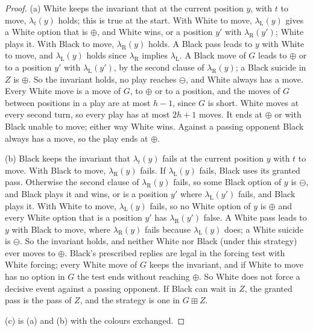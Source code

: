 \begin{proof}
(a) White keeps the invariant that at the current position $y$, with $t$ to move, $\lambda_t(y)$ holds; this is true at
the start. With White to move, $\lambda_{\mathrm L}(y)$ gives a White option that is $\oplus$, and White wins, or a
position $y'$ with $\lambda_{\mathrm R}(y')$; White plays it. With Black to move, $\lambda_{\mathrm R}(y)$ holds. A Black
pass leads to $y$ with White to move, and $\lambda_{\mathrm L}(y)$ holds since $\lambda_{\mathrm R}$ implies
$\lambda_{\mathrm L}$. A Black move of $G$ leads to $\oplus$ or to a position $y'$ with $\lambda_{\mathrm L}(y')$, by the
second clause of $\lambda_{\mathrm R}(y)$; a Black suicide in $Z$ is $\oplus$. So the invariant holds, no play reaches
$\ominus$, and White always has a move. Every White move is a move of $G$, to $\oplus$ or to a position, and the moves of
$G$ between positions in a play are at most $h-1$, since $G$ is short. White moves at every second turn, so every play
has at most $2h+1$ moves. It ends at $\oplus$ or with Black unable to move; either way White wins. Against a passing
opponent Black always has a move, so the play ends at $\oplus$.

(b) Black keeps the invariant that $\lambda_t(y)$ fails at the current position $y$ with $t$ to move. With Black to move,
$\lambda_{\mathrm R}(y)$ fails. If $\lambda_{\mathrm L}(y)$ fails, Black uses its granted pass. Otherwise the second
clause of $\lambda_{\mathrm R}(y)$ fails, so some Black option of $y$ is $\ominus$, and Black plays it and wins, or is a position
$y'$ where $\lambda_{\mathrm L}(y')$ fails, and Black plays it. With White to move, $\lambda_{\mathrm L}(y)$ fails, so no
White option of $y$ is $\oplus$ and every White option that is a position $y'$ has $\lambda_{\mathrm R}(y')$ false. A
White pass leads to $y$ with Black to move, where $\lambda_{\mathrm R}(y)$ fails because $\lambda_{\mathrm L}(y)$ does; a
White suicide is $\ominus$. So the invariant holds, and neither White nor Black (under this strategy) ever moves to
$\oplus$. Black's prescribed replies are legal in the forcing test with White forcing; every White move of $G$ keeps the
invariant, and if White to move has no option in $G$ the test ends without reaching $\oplus$. So White does not force a
decisive event against a passing opponent. If Black can wait in $Z$, the granted pass is the pass of $Z$, and the strategy is one in
$G\boxplus Z$.

(c) is (a) and (b) with the colours exchanged.
\end{proof}

